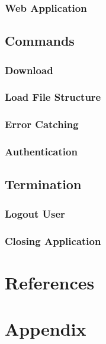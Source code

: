 \documentclass{article}
\begin{document}
            \subsubsection{Web Application}

        \subsection{Commands}
            \subsubsection{Download}
            
            \subsubsection{Load File Structure}

            \subsubsection{Error Catching}

            \subsubsection{Authentication}

        \subsection{Termination}
            \subsubsection{Logout User}

            \subsubsection{Closing Application}

    \section*{References}

    \appendix
    \section{Appendix}
\end{document}
